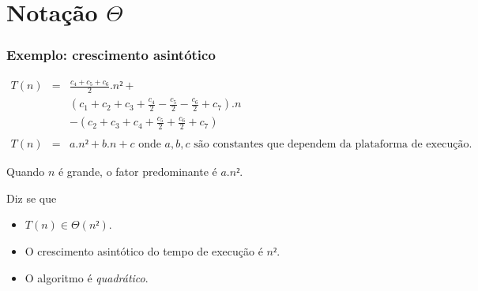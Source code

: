 \documentclass[handout]{beamer}
\begin{document}
\section{Notação $\Theta$}

\begin{frame}

\frametitle{Exemplo: crescimento asintótico}

  $$
  \begin{array}{rcl}
    T(n)
    & = & \frac{c_4+c_5+c_6}{2}.n² + \\
    & &   (c_1+c_2+c_3+\frac{c_4}{2}-\frac{c_5}{2}-\frac{c_6}{2} + c_7).n \\
    & & - (c_2 + c_3 + c_4 + \frac{c_5}{2} + \frac{c_6}{2} + c_7) \\
    \\
    T(n) & = & a.n² + b.n + c \mbox{ onde $a, b, c$ são constantes que dependem da plataforma de execução.}
  \end{array}
  $$

  Quando $n$ é grande, o fator predominante é $a.n²$.

  Diz se que
  
  \begin{itemize}

    \item $T(n) \in \Theta(n²)$.

    \item O crescimento asintótico do tempo de execução é $n²$.

    \item O algoritmo é \emph{quadrático}.

  \end{itemize}
  
\end{frame}
\end{document}
